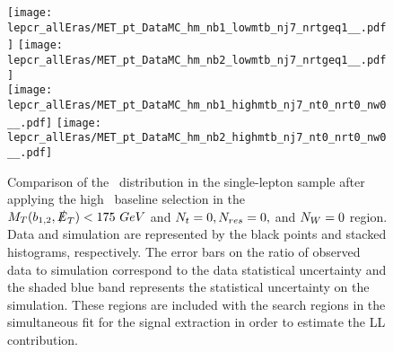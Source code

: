 \begin{figure}[!htb]
	\begin{center}
  \texttt{[image: lepcr\_allEras/MET\_pt\_DataMC\_hm\_nb1\_lowmtb\_nj7\_nrtgeq1\_\_.pdf]}
  \texttt{[image: lepcr\_allEras/MET\_pt\_DataMC\_hm\_nb2\_lowmtb\_nj7\_nrtgeq1\_\_.pdf]} \\
  \texttt{[image: lepcr\_allEras/MET\_pt\_DataMC\_hm\_nb1\_highmtb\_nj7\_nt0\_nrt0\_nw0\_\_.pdf]}
  \texttt{[image: lepcr\_allEras/MET\_pt\_DataMC\_hm\_nb2\_highmtb\_nj7\_nt0\_nrt0\_nw0\_\_.pdf]} \\
	\end{center}
	\caption[Lost Lepton HM Control Region]{Comparison of the \met~distribution in the single-lepton sample after applying the high \dm~baseline selection in the $M_{T}(b_{1,2},\slashed{E}_{T})<175~GeV$ and $N_{t}=0, N_{res}=0,$ and $N_{W}=0$ region. Data and simulation are represented by the black points and stacked histograms, respectively. The error bars on the ratio of observed data to simulation correspond to the data statistical uncertainty and the shaded blue band represents the statistical uncertainty on the simulation. These regions are included with the search regions in the simultaneous fit for the signal extraction in order to estimate the LL contribution.
	 }
	\label{fig:llb-1lcr-datavsmc-hm-nt0-nrt0-nw0}
\end{figure}

